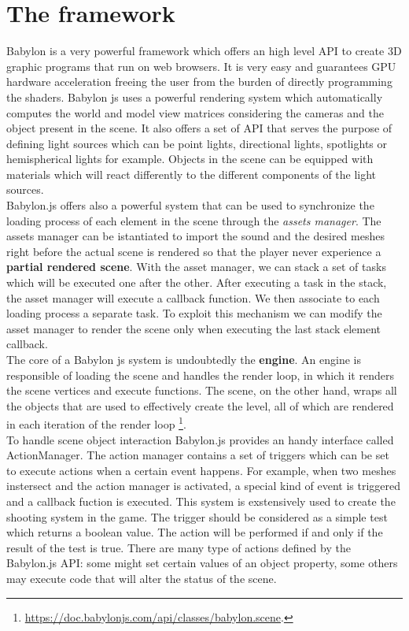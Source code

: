 \documentclass[14pt]{article}
\begin{document}
\section{The framework}\label{sec:technicalManual}
Babylon is a very powerful framework which offers an high level API to create 3D graphic programs that run on web browsers. It is very easy and guarantees GPU hardware acceleration freeing the user from the burden of directly programming the shaders. Babylon js uses a powerful rendering system which automatically computes the world and model view matrices considering the cameras and the object present in the scene. It also offers a set of API that serves the purpose of defining light sources which can be point lights, directional lights, spotlights or hemispherical lights for example. Objects in the scene can be equipped with materials which will react differently to the different components of the light sources. \\
Babylon.js offers also a powerful system that can be used to synchronize the loading process of each element in the scene through the \textit{assets manager}. The assets manager can be istantiated to import the sound and the desired meshes right before the actual scene is rendered so that the player never experience a \textbf{partial rendered scene}. With the asset manager, we can stack a set of tasks which will be executed one after the other. After executing a task in the stack, the asset manager will execute a callback function. We then associate to each loading process a separate task. To exploit this mechanism we can modify the asset manager to render the scene only when executing the last stack element callback.\\
The core of a Babylon js system is undoubtedly the \textbf{engine}. An engine is responsible of loading the scene and handles the render loop, in which it renders the scene vertices and execute functions. The scene, on the other hand, wraps all the objects that are used to effectively create the level, all of which are rendered in each iteration of the render loop \footnote{\url{https://doc.babylonjs.com/api/classes/babylon.scene}.}.\\
To handle scene object interaction Babylon.js provides an handy interface called ActionManager. The action manager contains a set of triggers which can be set to execute actions when a certain event happens. For example, when two meshes instersect and the action manager is activated, a special kind of event is triggered and a callback fuction is executed. This system is exstensively used to create the shooting system in the game. The trigger should be considered as a simple test which returns a boolean value. The action will be performed if and only if the result of the test is true. There are many type of actions defined by the Babylon.js API: some might set certain values of an object property, some others may execute code that will alter the status of the scene.\\
\end{document}
